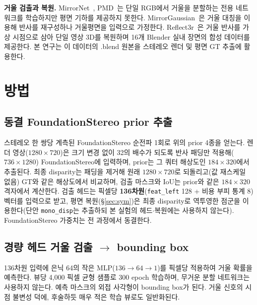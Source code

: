 \documentclass[10pt,a4paper]{article}
\begin{document}
\noindent\textbf{거울 검출과 복원.} MirrorNet~\cite{mirrornet2019}, PMD~\cite{pmd2020}는 단일 RGB에서 거울을 분할하는 전용 네트워크를 학습하지만 평면 기하를 제공하지 못한다. MirrorGaussian~\cite{mirrorgaussian2024}은 거울 대칭을 이용해 반사를 재구성하나 거울평면을 입력으로 가정한다. Reflect3r~\cite{reflect3r2026}은 거울 반사를 가상 시점으로 삼아 단일 영상 3D를 복원하며 16개 Blender 실내 장면의 합성 데이터를 제공한다. 본 연구는 이 데이터의 .blend 원본을 스테레오 렌더 및 평면 GT 추출에 활용한다.

\section{방법}

\subsection{동결 FoundationStereo prior 추출}
스테레오 한 쌍당 계측된 FoundationStereo 순전파 1회로 위의 prior 4종을 얻는다. 렌더 영상($1280\times720$)은 크기 변경 없이 32의 배수가 되도록 반사 패딩만 적용해($736\times1280$) FoundationStereo에 입력하며, prior는 그 쿼터 해상도인 $184\times320$에서 추출된다. 최종 disparity는 패딩을 제거해 원래 $1280\times720$로 되돌리고(값 재스케일 없음) GT와 같은 해상도에서 비교하며, 검출 마스크와 IoU는 prior와 같은 $184\times320$ 격자에서 계산한다. 검출 헤드는 픽셀당 \textbf{136차원}(\texttt{feat\_left} 128 + 비용 부피 통계 8) 벡터를 입력으로 받고, 평면 복원(\S\ref{sec:sym})은 최종 disparity로 역투영한 점군을 이용한다(단안 \texttt{mono\_disp}는 추출하되 본 실험의 헤드$\cdot$복원에는 사용하지 않는다). FoundationStereo 가중치는 전 과정에서 동결한다.

\subsection{경량 헤드 거울 검출 $\to$ bounding box}
\label{sec:detect}
136차원 입력에 은닉 64의 작은 MLP($136\to64\to1$)를 픽셀당 적용하여 거울 확률을 예측한다. 뷰당 4{,}000 픽셀 균형 샘플로 300 epoch 학습하며, 무거운 분할 네트워크는 사용하지 않는다. 예측 마스크의 외접 사각형이 bounding box가 된다. 거울 신호의 시점 불변성 덕에, 후술하듯 매우 적은 학습 뷰로도 일반화된다.
\end{document}
